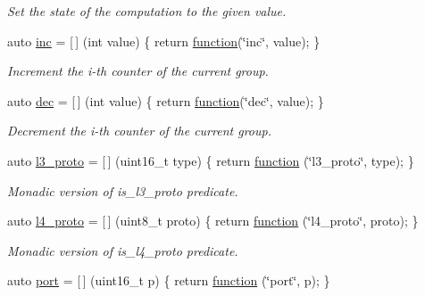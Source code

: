 \begin{DoxyCompactItemize}
\begin{DoxyCompactList}\small\item\em Set the state of the computation to the given value. \end{DoxyCompactList}\item 
auto \hyperlink{namespacepfq_1_1lang_1_1anonymous__namespace_02default_8hpp_03_acc7d3a4cca5eb30ff5456e19c613b174}{inc} = \mbox{[}$\,$\mbox{]} (int value) \{ return \hyperlink{namespacepfq_1_1lang_a1a4638059d700ae08d0ca63886ff2bb3}{function}(\char`\"{}inc\char`\"{}, value); \}
\begin{DoxyCompactList}\small\item\em Increment the i-\/th counter of the current group. \end{DoxyCompactList}\item 
auto \hyperlink{namespacepfq_1_1lang_1_1anonymous__namespace_02default_8hpp_03_a139906841e77a2eb86b761b27ceeb685}{dec} = \mbox{[}$\,$\mbox{]} (int value) \{ return \hyperlink{namespacepfq_1_1lang_a1a4638059d700ae08d0ca63886ff2bb3}{function}(\char`\"{}dec\char`\"{}, value); \}
\begin{DoxyCompactList}\small\item\em Decrement the i-\/th counter of the current group. \end{DoxyCompactList}\item 
auto \hyperlink{namespacepfq_1_1lang_1_1anonymous__namespace_02default_8hpp_03_a1515f230673119530cd04f213627976f}{l3\+\_\+proto} = \mbox{[}$\,$\mbox{]} (uint16\+\_\+t type) \{ return \hyperlink{namespacepfq_1_1lang_a1a4638059d700ae08d0ca63886ff2bb3}{function} (\char`\"{}l3\+\_\+proto\char`\"{}, type); \}
\begin{DoxyCompactList}\small\item\em Monadic version of {\ttfamily is\+\_\+l3\+\_\+proto} predicate. \end{DoxyCompactList}\item 
auto \hyperlink{namespacepfq_1_1lang_1_1anonymous__namespace_02default_8hpp_03_a8ad2208c91dc3cd4378e715aab5fb4b7}{l4\+\_\+proto} = \mbox{[}$\,$\mbox{]} (uint8\+\_\+t proto) \{ return \hyperlink{namespacepfq_1_1lang_a1a4638059d700ae08d0ca63886ff2bb3}{function} (\char`\"{}l4\+\_\+proto\char`\"{}, proto); \}
\begin{DoxyCompactList}\small\item\em Monadic version of {\ttfamily is\+\_\+l4\+\_\+proto} predicate. \end{DoxyCompactList}\item 
auto \hyperlink{namespacepfq_1_1lang_1_1anonymous__namespace_02default_8hpp_03_a868eca03290a037cb4e9b7075085888b}{port} = \mbox{[}$\,$\mbox{]} (uint16\+\_\+t p) \{ return \hyperlink{namespacepfq_1_1lang_a1a4638059d700ae08d0ca63886ff2bb3}{function} (\char`\"{}port\char`\"{}, p); \}

\end{DoxyCompactItemize}
